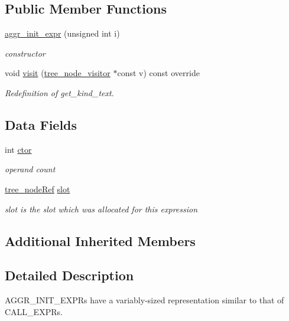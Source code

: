 \subsection*{Public Member Functions}
\begin{DoxyCompactItemize}
\item 
\hyperlink{structaggr__init__expr_acd64e3e854ae974b507a2950b8fd60fd}{aggr\+\_\+init\+\_\+expr} (unsigned int i)
\begin{DoxyCompactList}\small\item\em constructor \end{DoxyCompactList}\item 
void \hyperlink{structaggr__init__expr_af28d5b47d09253a4ab8b59fbf776369d}{visit} (\hyperlink{classtree__node__visitor}{tree\+\_\+node\+\_\+visitor} $\ast$const v) const override
\begin{DoxyCompactList}\small\item\em Redefinition of get\+\_\+kind\+\_\+text. \end{DoxyCompactList}\end{DoxyCompactItemize}
\subsection*{Data Fields}
\begin{DoxyCompactItemize}
\item 
int \hyperlink{structaggr__init__expr_a76134031ab5080a436b150b15a16637b}{ctor}
\begin{DoxyCompactList}\small\item\em operand count \end{DoxyCompactList}\item 
\hyperlink{tree__node_8hpp_a6ee377554d1c4871ad66a337eaa67fd5}{tree\+\_\+node\+Ref} \hyperlink{structaggr__init__expr_a53f33ec3f4ee2f3b39a6f84d5c44396a}{slot}
\begin{DoxyCompactList}\small\item\em slot is the slot which was allocated for this expression \end{DoxyCompactList}\end{DoxyCompactItemize}
\subsection*{Additional Inherited Members}


\subsection{Detailed Description}
A\+G\+G\+R\+\_\+\+I\+N\+I\+T\+\_\+\+E\+X\+P\+Rs have a variably-\/sized representation similar to that of C\+A\+L\+L\+\_\+\+E\+X\+P\+Rs. 

